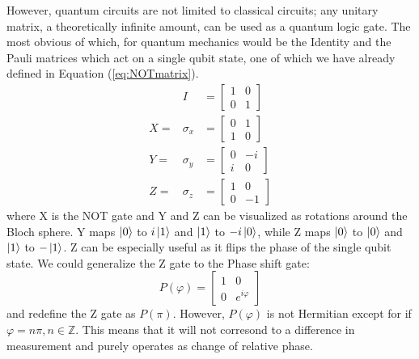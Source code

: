 \documentclass[reqno]{amsart}
\numberwithin{equation}{section}
\numberwithin{figure}{section}
\begin{document}
\begin{justify}
However, quantum circuits are not limited to classical circuits; any unitary matrix, a theoretically infinite amount, \cite{Barenco1995} can be used as a quantum logic gate. The most obvious of which, for quantum mechanics would be the Identity and the Pauli matrices \cite{Pauli1925} which act on a single qubit state, one of which we have already defined in Equation (\ref{eq:NOTmatrix}).
    \begin{eqnarray}
        &I& = \begin{bmatrix}
                1 & 0 \\
                0 & 1
                \end{bmatrix} \\
        X = &\sigma_{x}& = \begin{bmatrix}
                            0 & 1 \\
                            1 & 0
                            \end{bmatrix} \\
        Y = &\sigma_{y}& = \begin{bmatrix}
                            0 & -i \\
                            i & 0
                            \end{bmatrix} \\
        Z = &\sigma_{z}& = \begin{bmatrix}
                            1 & 0 \\
                            0 & -1
                            \end{bmatrix}
    \end{eqnarray}
where X is the NOT gate and Y and Z can be visualized as rotations around the Bloch sphere. Y maps $\ket{0}$ to $i\ket{1}$ and $\ket{1}$ to $-i\ket{0}$, while Z maps $\ket{0}$ to $\ket{0}$ and $\ket{1}$ to $-\ket{1}$. Z can be especially useful as it flips the phase of the single qubit state. We could generalize the Z gate to the Phase shift gate:
    \begin{equation}
        P(\varphi) = \begin{bmatrix}
                    1 & 0 \\
                    0 & e^{i\varphi}
                    \end{bmatrix}
    \end{equation}
and redefine the Z gate as $P(\pi)$. However, $P(\varphi)$ is not Hermitian except for if $\varphi = n\pi, n \in \mathbb{Z}$. This means that it will not corresond to a difference in measurement and purely operates as change of relative phase. \\


\end{justify}
\end{document}
